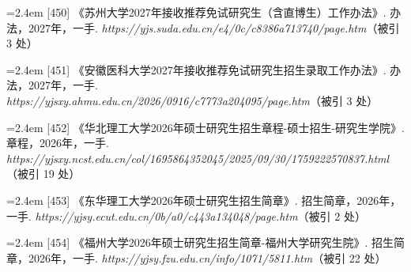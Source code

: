 {\vspace{0.6pt}
\vspace{3.5pt}\par
\nopagebreak\vspace{1pt}
\noindent\hangindent=2.4em \label{src:S0599}{\color{cAccent}[450]} 《苏州大学2027年接收推荐免试研究生（含直博生）工作办法》. 办法，2027年，一手. \textit{https://yjs.suda.edu.cn/e4/0c/c8386a713740/page.htm}（被引 3 处）\par
\vspace{0.6pt}
\vspace{3.5pt}\par
\nopagebreak\vspace{1pt}
\noindent\hangindent=2.4em \label{src:S0600}{\color{cAccent}[451]} 《安徽医科大学2027年接收推荐免试研究生招生录取工作办法》. 办法，2027年，一手. \textit{https://yjsxy.ahmu.edu.cn/2026/0916/c7773a204095/page.htm}（被引 3 处）\par
\vspace{0.6pt}
\vspace{3.5pt}\par
\nopagebreak\vspace{1pt}
\noindent\hangindent=2.4em \label{src:S0601}{\color{cAccent}[452]} 《华北理工大学2026年硕士研究生招生章程-硕士招生-研究生学院》. 章程，2026年，一手. \textit{https://yjsxy.ncst.edu.cn/col/1695864352045/2025/09/30/1759222570837.html}（被引 19 处）\par
\vspace{0.6pt}
\vspace{3.5pt}\par
\nopagebreak\vspace{1pt}
\noindent\hangindent=2.4em \label{src:S0602}{\color{cAccent}[453]} 《东华理工大学2026年硕士研究生招生简章》. 招生简章，2026年，一手. \textit{https://yjsy.ecut.edu.cn/0b/a0/c443a134048/page.htm}（被引 2 处）\par
\vspace{0.6pt}
\vspace{3.5pt}\par
\nopagebreak\vspace{1pt}
\noindent\hangindent=2.4em \label{src:S0603}{\color{cAccent}[454]} 《福州大学2026年硕士研究生招生简章-福州大学研究生院》. 招生简章，2026年，一手. \textit{https://yjsy.fzu.edu.cn/info/1071/5811.htm}（被引 22 处）\par
}

